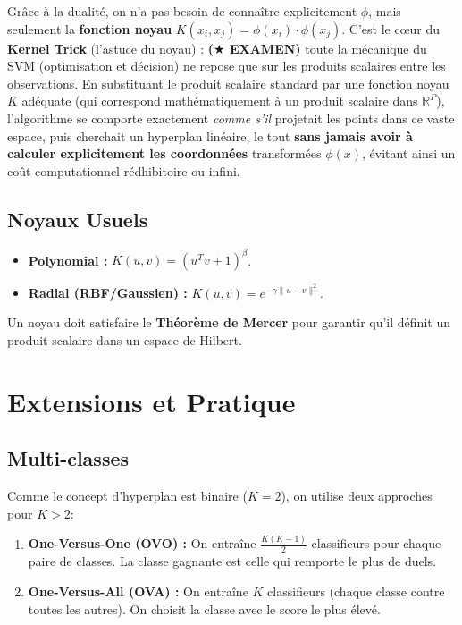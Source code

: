 Grâce à la dualité, on n'a pas besoin de connaître explicitement $\phi$, mais seulement la \textbf{fonction noyau} $K(x_i, x_j) = \phi(x_i) \cdot \phi(x_j)$. C'est le cœur du \textbf{Kernel Trick} (l'astuce du noyau) : \textbf{($\bigstar$ EXAMEN)} toute la mécanique du SVM (optimisation et décision) ne repose que sur les produits scalaires entre les observations. En substituant le produit scalaire standard par une fonction noyau $K$ adéquate (qui correspond mathématiquement à un produit scalaire dans $\mathbb{R}^P$), l'algorithme se comporte exactement \textit{comme s'il} projetait les points dans ce vaste espace, puis cherchait un hyperplan linéaire, le tout \textbf{sans jamais avoir à calculer explicitement les coordonnées} transformées $\phi(x)$, évitant ainsi un coût computationnel rédhibitoire ou infini.

\subsection{Noyaux Usuels}
\begin{itemize}
    \item \textbf{Polynomial :} $K(u, v) = (u^T v + 1)^\beta$.
    \item \textbf{Radial (RBF/Gaussien) :} $K(u, v) = e^{-\gamma \|u-v\|^2}$.
\end{itemize}
Un noyau doit satisfaire le \textbf{Théorème de Mercer} pour garantir qu'il définit un produit scalaire dans un espace de Hilbert.

\section{Extensions et Pratique}

\subsection{Multi-classes}
Comme le concept d'hyperplan est binaire ($K=2$), on utilise deux approches pour $K > 2$:
\begin{enumerate}
    \item \textbf{One-Versus-One (OVO) :} On entraîne $\frac{K(K-1)}{2}$ classifieurs pour chaque paire de classes. La classe gagnante est celle qui remporte le plus de duels.
    \item \textbf{One-Versus-All (OVA) :} On entraîne $K$ classifieurs (chaque classe contre toutes les autres). On choisit la classe avec le score le plus élevé.
\end{enumerate}


